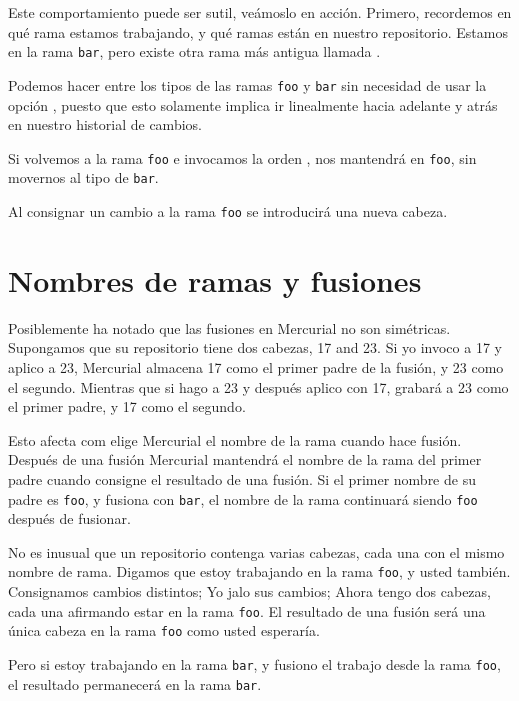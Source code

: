 Este comportamiento puede ser sutil, veámoslo en acción.  Primero,
recordemos en qué rama estamos trabajando, y qué ramas están en
nuestro repositorio.
Estamos en la rama \texttt{bar}, pero existe otra rama más antigua
llamada .

Podemos hacer  entre los tipos de las ramas \texttt{foo}
y \texttt{bar} sin necesidad de usar la opción ,
puesto que esto solamente implica ir linealmente hacia adelante y
atrás en nuestro historial de cambios.

Si volvemos a la rama \texttt{foo} e invocamos la orden ,
nos mantendrá en \texttt{foo}, sin movernos al tipo de \texttt{bar}.

Al consignar un cambio a la rama \texttt{foo} se introducirá una nueva
cabeza.

\section{Nombres de ramas y fusiones}

Posiblemente ha notado que las fusiones en Mercurial no son simétricas.
Supongamos que su repositorio tiene dos cabezas, 17 and 23.  Si yo invoco
 a 17 y aplico  a 23, Mercurial almacena 17
como el primer padre de la fusión, y 23 como el segundo. Mientras que
si hago  a 23 y después aplico  con 17,
grabará a 23 como el primer padre, y 17 como el segundo.

Esto afecta com elige Mercurial el nombre de la rama cuando hace
fusión.  Después de una fusión Mercurial mantendrá el nombre de la
rama del primer padre cuando consigne el resultado de una fusión.  Si
el primer nombre de su padre es \texttt{foo}, y fusiona con
\texttt{bar}, el nombre de la rama continuará siendo \texttt{foo}
después de fusionar.

No es inusual que un repositorio contenga varias cabezas, cada una con
el mismo nombre de rama.  Digamos que estoy trabajando en la rama
\texttt{foo}, y usted también.  Consignamos cambios distintos; Yo jalo
sus cambios; Ahora tengo dos cabezas, cada una afirmando estar en la
rama \texttt{foo}.  El resultado de una fusión será una única cabeza
en la rama \texttt{foo} como usted esperaría.

Pero si estoy trabajando en la rama \texttt{bar}, y fusiono el trabajo
desde la rama \texttt{foo}, el resultado permanecerá en la rama
\texttt{bar}.

